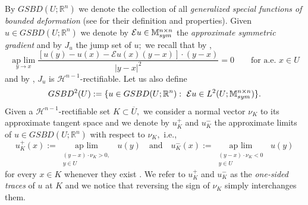 \documentclass[reqno]{amsart}
\numberwithin{equation}{section}
\theoremstyle{plain}
\theoremstyle{definition}
\newcommand{\R}{\mathbb{R}}
\newcommand{\cH}{\mathcal{H}}
\newcommand{\aplim}{\mathop{\mathrm{ap\,\, lim}}}
\newcommand{\str}[1]{\mathcal{E}#1}
\newcommand{\mtwo}{\mathbb{M}^{n\times n}_{\rm sym}}
\begin{document}
By $GSBD(U;\R^n)$ we denote the collection of all \emph{generalized special functions of bounded deformation} (see \cite{ChC:2020_jems,D:2013_jems} for their definition and properties). Given $u\in GSBD(U;\R^n)$ we denote by $\str{u}\in\mtwo$ the
\emph{approximate symmetric gradient} and by $J_u$ the jump set of $u;$ we recall that  by \cite[Theorem 9.1]{D:2013_jems},
%
\begin{equation}\label{approx_sym_gradents}
\aplim\limits_{y\to x} \frac{[u(y) - u(x) - \str{u}(x)(y-x)] \cdot (y-x)}{|y-x|^2}=0\qquad\text{for a.e.\  $x\in U$} 
\end{equation} 
and by \cite[Theorem 6.2]{D:2013_jems}, $J_u$ is $\cH^{n-1}$-rectifiable.  Let us also define
$$
GSBD^2(U):=\{u\in GSBD(U;\R^n):\,\,\str{u}\in L^2(U;\mtwo)\}.
$$ 
Given a $\cH^{n-1}$-rectifiable set $K\subset \overline{U},$ we
consider a normal vector $\nu_K$ to its approximate tangent space and we denote by $u_K^+$ and $u_K^-$ the approximate limits of $u\in GSBD(U;\R^n)$ with respect to $\nu_K,$  i.e., 
\begin{equation*} 
u_K^+(x):=\aplim\limits_{\substack{(y-x)\cdot \nu_K>0,\\y\in U}} \,\,u(y)\quad \text{and}\quad u_K^-(x):= \aplim\limits_{\substack{(y-x)\cdot \nu_K<0\\y\in U}}\,\, u(y)  
\end{equation*}
%
for every $x\in K$ whenever they exist \cite[Definition 2.4]{D:2013_jems}.
We refer to $u_K^+$ and $u_K^-$ as the \emph{one-sided traces} of $u$ at $K$ and we notice that reversing the sign of $\nu_K$ simply  interchanges them.
\end{document}
